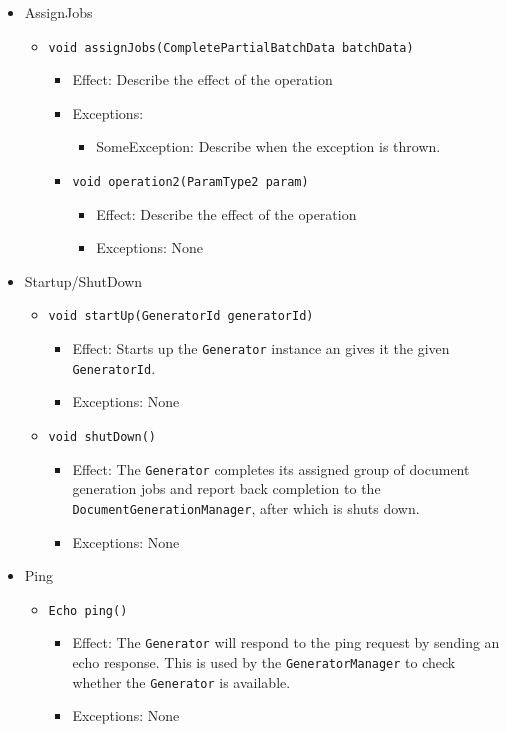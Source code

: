 \documentclass[a4paper,10pt]{article}
\begin{document}
\begin{itemize}
    \item AssignJobs
    \begin{itemize}
        \item \texttt{void assignJobs(CompletePartialBatchData batchData)}
        \begin{itemize}
            \item Effect: Describe the effect of the operation
            \item Exceptions:
            \begin{itemize}
                \item SomeException: Describe when the exception is thrown.
            \end{itemize}

            \item \texttt{void operation2(ParamType2 param)}
            \begin{itemize}
                \item Effect: Describe the effect of the operation
                \item Exceptions: None
            \end{itemize}
        \end{itemize}
    \end{itemize}

    \item Startup/ShutDown
    \begin{itemize}
        \item \texttt{void startUp(GeneratorId generatorId)}
        \begin{itemize}
            \item Effect: Starts up the \texttt{Generator} instance an gives it the given \texttt{GeneratorId}. 
            \item Exceptions: None
        \end{itemize}
          \item \texttt{void shutDown()}
        \begin{itemize}
            \item Effect: The \texttt{Generator} completes its assigned group of document generation jobs and report back completion to the \texttt{DocumentGenerationManager}, after which is shuts down.
            \item Exceptions: None
        \end{itemize}
    \end{itemize}
    
    \item Ping
    \begin{itemize}
        \item \texttt{Echo ping()}
        \begin{itemize}
            \item Effect: The \texttt{Generator} will respond to the ping request by sending an echo response. This is used by the \texttt{GeneratorManager} to check whether the \texttt{Generator} is available.
            \item Exceptions: None
        \end{itemize}
    \end{itemize}
\end{itemize}
\end{document}
